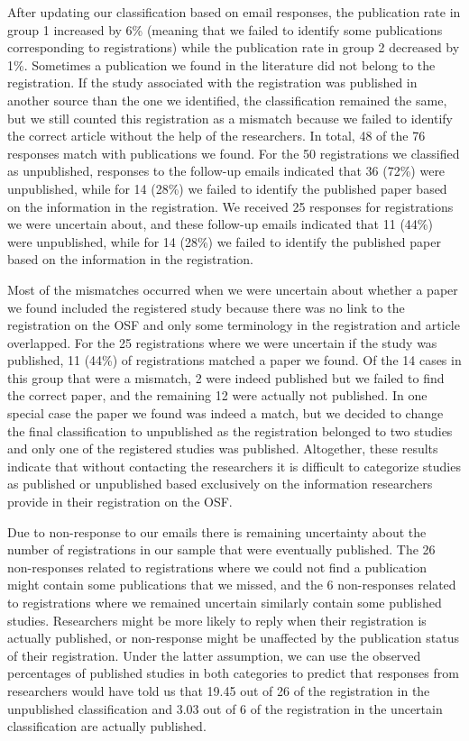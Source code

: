 \documentclass[
  ,jou, a4paper,floatsintext]{apa6}
\begin{document}
After updating our classification based on email responses, the publication rate in group 1 increased by 6\% (meaning that we failed to identify some publications corresponding to registrations) while the publication rate in group 2 decreased by 1\%. Sometimes a publication we found in the literature did not belong to the registration. If the study associated with the registration was published in another source than the one we identified, the classification remained the same, but we still counted this registration as a mismatch because we failed to identify the correct article without the help of the researchers. In total, 48 of the 76 responses match with publications we found. For the 50 registrations we classified as unpublished, responses to the follow-up emails indicated that 36 (72\%) were unpublished, while for 14 (28\%) we failed to identify the published paper based on the information in the registration. We received 25 responses for registrations we were uncertain about, and these follow-up emails indicated that 11 (44\%) were unpublished, while for 14 (28\%) we failed to identify the published paper based on the information in the registration.

Most of the mismatches occurred when we were uncertain about whether a paper we found included the registered study because there was no link to the registration on the OSF and only some terminology in the registration and article overlapped. For the 25 registrations where we were uncertain if the study was published, 11 (44\%) of registrations matched a paper we found. Of the 14 cases in this group that were a mismatch, 2 were indeed published but we failed to find the correct paper, and the remaining 12 were actually not published. In one special case the paper we found was indeed a match, but we decided to change the final classification to unpublished as the registration belonged to two studies and only one of the registered studies was published. Altogether, these results indicate that without contacting the researchers it is difficult to categorize studies as published or unpublished based exclusively on the information researchers provide in their registration on the OSF.

Due to non-response to our emails there is remaining uncertainty about the number of registrations in our sample that were eventually published. The 26 non-responses related to registrations where we could not find a publication might contain some publications that we missed, and the 6 non-responses related to registrations where we remained uncertain similarly contain some published studies. Researchers might be more likely to reply when their registration is actually published, or non-response might be unaffected by the publication status of their registration. Under the latter assumption, we can use the observed percentages of published studies in both categories to predict that responses from researchers would have told us that 19.45 out of 26 of the registration in the unpublished classification and 3.03 out of 6 of the registration in the uncertain classification are actually published.
\end{document}

